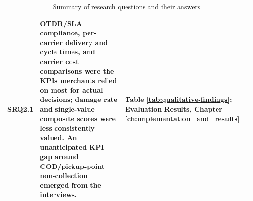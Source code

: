 \documentclass{imc-inf}
\begin{document}
\begin{table}[!htbp]
\begin{tabular}{@{}>{\raggedright\arraybackslash}p{1.3cm}p{9cm}p{3.4cm}@{}}
    SRQ2.1                                                                                                                                                                                                                                                                                                                         &
    OTDR/SLA compliance, per-carrier delivery and cycle times, and carrier cost comparisons were the KPIs merchants relied on most for actual decisions; damage rate and single-value composite scores were less consistently valued. An unanticipated KPI gap around COD/pickup-point non-collection emerged from the interviews. &
    Table \ref{tab:qualitative-findings}; Evaluation Results, Chapter \ref{ch:implementation_and_results}                                                                                                                                                                                                                                                                                  \\
    \bottomrule
  \end{tabular}
  \caption{Summary of research questions and their answers}
  \label{tab:rq-summary}
\end{table}
\end{document}
